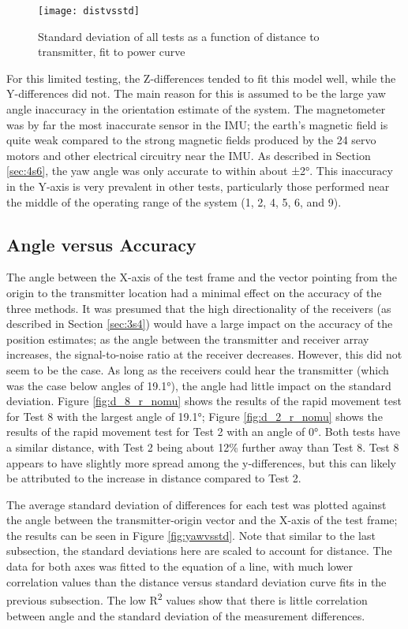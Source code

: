 \documentclass[11pt]{ucthesisCP}
\begin{document}
\begin{figure}[htbp]
	\centering
	\texttt{[image: distvsstd]}
	\caption{Standard deviation of all tests as a function of distance to transmitter, fit to power curve}
	\label{fig:distvsstd}
\end{figure}

For this limited testing, the Z-differences tended to fit this model well, while the Y-differences did not. The main reason for this is assumed to be the large yaw angle inaccuracy in the orientation estimate of the system. The magnetometer was by far the most inaccurate sensor in the IMU; the earth’s magnetic field is quite weak compared to the strong magnetic fields produced by the 24 servo motors and other electrical circuitry near the IMU. As described in Section \ref{sec:4s6}, the yaw angle was only accurate to within about ±2°. This inaccuracy in the Y-axis is very prevalent in other tests, particularly those performed near the middle of the operating range of the system (1, 2, 4, 5, 6, and 9).

\subsection{Angle versus Accuracy} \label{ssec:6s2s2}
The angle between the X-axis of the test frame and the vector pointing from the origin to the transmitter location had a minimal effect on the accuracy of the three methods. It was presumed that the high directionality of the receivers (as described in Section \ref{sec:3s4}) would have a large impact on the accuracy of the position estimates; as the angle between the transmitter and receiver array increases, the signal-to-noise ratio at the receiver decreases. However, this did not seem to be the case. As long as the receivers could hear the transmitter (which was the case below angles of 19.1°), the angle had little impact on the standard deviation. Figure \ref{fig:d_8_r_nomu} shows the results of the rapid movement test for Test 8 with the largest angle of 19.1°; Figure \ref{fig:d_2_r_nomu} shows the results of the rapid movement test for Test 2 with an angle of 0°. Both tests have a similar distance, with Test 2 being about 12\% further away than Test 8. Test 8 appears to have slightly more spread among the y-differences, but this can likely be attributed to the increase in distance compared to Test 2. 

The average standard deviation of differences for each test was plotted against the angle between the transmitter-origin vector and the X-axis of the test frame; the results can be seen in Figure \ref{fig:yawvsstd}. Note that similar to the last subsection, the standard deviations here are scaled to account for distance. The data for both axes was fitted to the equation of a line, with much lower correlation values than the distance versus standard deviation curve fits in the previous subsection. The low R\textsuperscript{2} values show that there is little correlation between angle and the standard deviation of the measurement differences.
\end{document}
